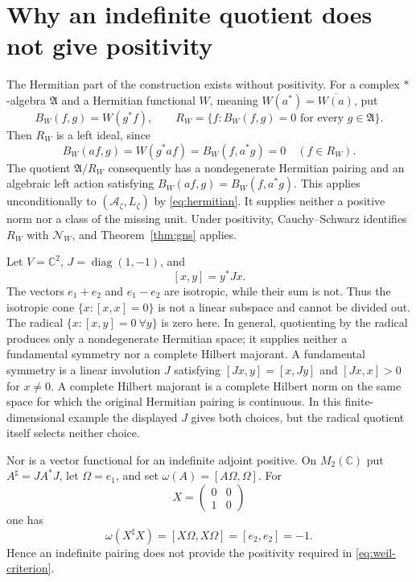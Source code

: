 \documentclass[11pt]{article}
\theoremstyle{definition}
\theoremstyle{remark}
\numberwithin{equation}{section}
\newcommand{\cA}{\mathcal A}
\newcommand{\cN}{\mathcal N}
\newcommand{\C}{\mathbb C}
\begin{document}
\section{Why an indefinite quotient does not give positivity}

The Hermitian part of the construction exists without positivity.
For a complex $*$-algebra $\mathfrak A$ and a Hermitian functional $W$,
meaning $W(a^*)=\overline{W(a)}$, put
\[
 B_W(f,g)=W(g^*f),\qquad
 R_W=\{f:B_W(f,g)=0\text{ for every }g\in\mathfrak A\}.
\]
Then $R_W$ is a left ideal, since
\[
 B_W(af,g)=W(g^*af)=B_W(f,a^*g)=0\quad(f\in R_W).
\]
The quotient $\mathfrak A/R_W$ consequently has a nondegenerate Hermitian
pairing and an algebraic left action satisfying
$B_W(af,g)=B_W(f,a^*g)$.
This applies unconditionally to $(\cA_\zeta,L_\zeta)$ by
\eqref{eq:hermitian}.  It supplies neither a positive norm nor a class of
the missing unit.  Under positivity, Cauchy--Schwarz identifies $R_W$
with $\cN_W$, and Theorem~\ref{thm:gns} applies.

Let $V=\C^2$, $J=\operatorname{diag}(1,-1)$, and
\[
 [x,y]=y^*Jx.
\]
The vectors $e_1+e_2$ and $e_1-e_2$ are isotropic, while their sum is
not.  Thus the isotropic cone $\{x:[x,x]=0\}$ is not a linear subspace
and cannot be divided out.  The radical
$\{x:[x,y]=0\ \forall y\}$ is zero here.  In general, quotienting by the
radical produces only a nondegenerate Hermitian space; it supplies
neither a fundamental symmetry nor a complete Hilbert majorant.
A fundamental symmetry is a linear involution $J$ satisfying
$[Jx,y]=[x,Jy]$ and $[Jx,x]>0$ for $x\ne0$.
A complete Hilbert majorant is a complete Hilbert norm on the same space
for which the original Hermitian pairing is continuous.
In this finite-dimensional example the displayed $J$ gives both choices,
but the radical quotient itself selects neither choice.

Nor is a vector functional for an indefinite adjoint positive.  On
$M_2(\C)$ put $A^\sharp=JA^*J$, let $\Omega=e_1$, and set
$\omega(A)=[A\Omega,\Omega]$.  For
\[
 X=\begin{pmatrix}0&0\\1&0\end{pmatrix}
\]
one has
\begin{equation}
 \omega(X^\sharp X)=[X\Omega,X\Omega]=[e_2,e_2]=-1.
 \label{eq:indefinite-negative}
\end{equation}
Hence an indefinite pairing does not provide the positivity required in
\eqref{eq:weil-criterion}.

\end{document}
